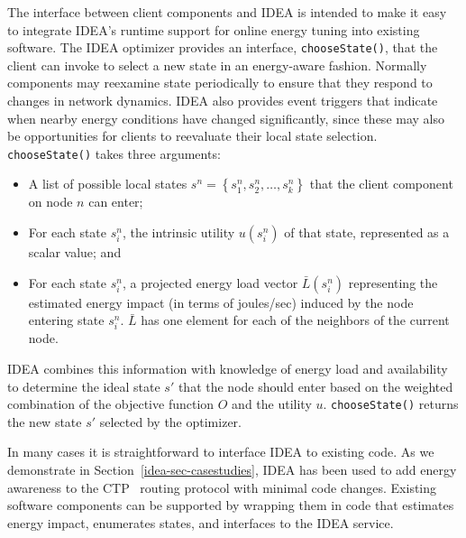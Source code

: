 The interface between client components and IDEA is intended to make it easy
to integrate IDEA's runtime support for online energy tuning into existing
software. The IDEA optimizer provides an interface, \texttt{chooseState()},
that the client can invoke to select a new state in an energy-aware fashion.
Normally components may reexamine state periodically to ensure that they
respond to changes in network dynamics. IDEA also provides event triggers
that indicate when nearby energy conditions have changed significantly, since
these may also be opportunities for clients to reevaluate their local state
selection.  \texttt{chooseState()} takes three arguments: \begin{itemize}
\item A list of possible local states $s^n = \left\{ s^n_1, s^n_2, \ldots,
s^n_k\right\}$ that the client component on node $n$ can enter; \item For
each state $s^n_i$, the intrinsic utility $u(s^n_i)$ of that state,
represented as a scalar value; and \item For each state $s^n_i$, a projected
energy load vector $\bar{L}(s^n_i)$ representing the estimated energy impact
(in terms of joules/sec) induced by the node entering state $s^n_i$.
$\bar{L}$ has one element for each of the neighbors of the current node.
\end{itemize} IDEA combines this information with knowledge of energy load
and availability to determine the ideal state $s'$ that the node should enter
based on the weighted combination of the objective function $O$ and the
utility $u$. \texttt{chooseState()} returns the new state $s'$ selected by
the optimizer.

In many cases it is straightforward to interface IDEA to existing code. As we
demonstrate in Section~\ref{idea-sec-casestudies}, IDEA has been used to add
energy awareness to the CTP~\cite{ctp-sensys09} routing protocol with minimal
code changes. Existing software components can be supported by wrapping them
in code that estimates energy impact, enumerates states, and interfaces to
the IDEA service.
